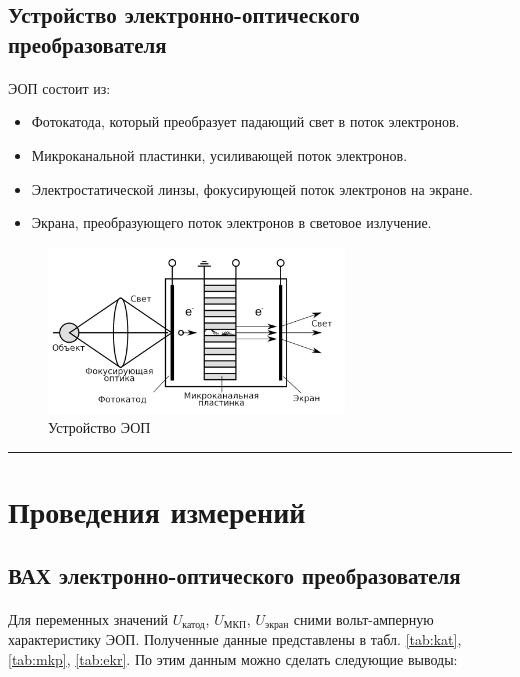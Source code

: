 \documentclass[a4paper,12pt]{article} %
\begin{document}
\subsection{Устройство электронно-оптического преобразователя}

\paragraph{} ЭОП состоит из:

\begin{itemize}
\item Фотокатода, который преобразует падающий свет в поток электронов.
\item Микроканальной пластинки, усиливающей поток электронов.
\item Электростатической линзы, фокусирующей поток электронов на экране.
\item Экрана, преобразующего поток электронов в световое излучение.
\end{itemize}

\begin{figure}[h]
\centering
\includegraphics[width=0.7\textwidth]{setup.png}
\caption{Устройство ЭОП}
\label{fig:setup}
\end{figure}


\medskip\hrule\medskip

\section{Проведения измерений}

\subsection{ВАХ электронно-оптического преобразователя}

\paragraph{} Для переменных значений $U_\text{катод}$, $U_\text{МКП}$, $U_\text{экран}$ сними вольт-амперную характеристику ЭОП. Полученные данные представлены в табл. \ref{tab:kat}, \ref{tab:mkp}, \ref{tab:ekr}. По этим данным можно сделать следующие выводы:
\end{document}
